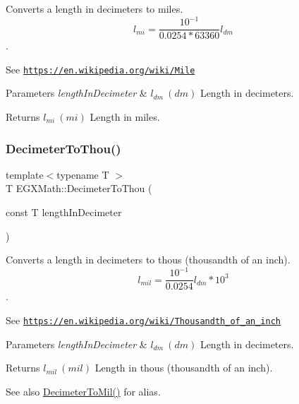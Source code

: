 Converts a length in decimeters to miles. \[ l_{mi}=\frac{10^{-1}}{0.0254 * 63360} l_{dm} \]. 

See \href{https://en.wikipedia.org/wiki/Mile}{\tt https\+://en.\+wikipedia.\+org/wiki/\+Mile} 
\begin{DoxyParams}{Parameters}
{\em length\+In\+Decimeter} & $ l_{dm}\ (dm)$ Length in decimeters. \\
\hline
\end{DoxyParams}
\begin{DoxyReturn}{Returns}
$ l_{mi}\ (mi)$ Length in miles. 
\end{DoxyReturn}
\mbox{\label{group___e_g_x_math-_conversions-_length_conversions-_decimeter-_imperial_gafc294e549fcdd1c43545ca9624abcafb}} 
\subsubsection{\texorpdfstring{Decimeter\+To\+Thou()}{DecimeterToThou()}}
{\footnotesize\ttfamily template$<$typename T $>$ \\
T E\+G\+X\+Math\+::\+Decimeter\+To\+Thou (\begin{DoxyParamCaption}\item[{const T}]{length\+In\+Decimeter }\end{DoxyParamCaption})}



Converts a length in decimeters to thous (thousandth of an inch). \[ l_{mil}= \frac{10^{-1}}{0.0254} l_{dm} * 10^{3} \]. 

See \href{https://en.wikipedia.org/wiki/Thousandth_of_an_inch}{\tt https\+://en.\+wikipedia.\+org/wiki/\+Thousandth\+\_\+of\+\_\+an\+\_\+inch} 
\begin{DoxyParams}{Parameters}
{\em length\+In\+Decimeter} & $ l_{dm}\ (dm)$ Length in decimeters. \\
\hline
\end{DoxyParams}
\begin{DoxyReturn}{Returns}
$ l_{mil}\ (mil)$ Length in thous (thousandth of an inch). 
\end{DoxyReturn}
\begin{DoxySeeAlso}{See also}
\mbox{\hyperlink{group___e_g_x_math-_conversions-_length_conversions-_decimeter-_imperial_gad2ce3f2de1fdda0216bdb56c4844b5e5}{Decimeter\+To\+Mil()}} for alias. 
\end{DoxySeeAlso}
\mbox{\label{group___e_g_x_math-_conversions-_length_conversions-_decimeter-_imperial_ga2ffbd73da0cc3cbb36822127433e3267}} 
